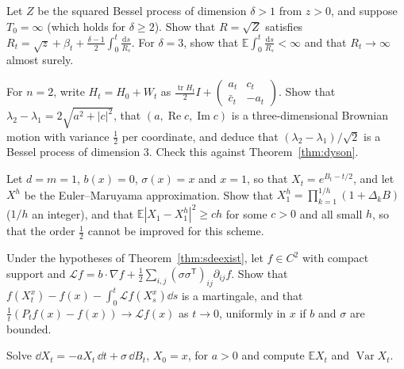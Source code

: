 \begin{exercise}[$\star\star$]\label{ex:bessel3}
Let $Z$ be the squared Bessel process of dimension $\delta>1$ from $z>0$, and suppose $T_0=\infty$ (which holds for $\delta\ge2$). Show that $R=\sqrt Z$ satisfies $R_t=\sqrt z+\beta_t+\frac{\delta-1}2\int_0^t\frac{\mathrm ds}{R_s}$.
For $\delta=3$, show that $\mathbb E\int_0^t\frac{\mathrm ds}{R_s}<\infty$ and that $R_t\to\infty$ almost surely.
\end{exercise}

\begin{exercise}[$\star\star$]\label{ex:twobytwo}
For $n=2$, write $H_t=H_0+W_t$ as $\frac{\operatorname{tr}H_t}2I+\begin{pmatrix}a_t&c_t\\\bar c_t&-a_t\end{pmatrix}$. Show that $\lambda_2-\lambda_1=2\sqrt{a^2+|c|^2}$, that $(a,\operatorname{Re}c,\operatorname{Im}c)$ is a
three-dimensional Brownian motion with variance $\frac12$ per coordinate, and deduce that $(\lambda_2-\lambda_1)/\sqrt2$ is a Bessel process of dimension $3$. Check this against Theorem~\ref{thm:dyson}.
\end{exercise}

\begin{exercise}[$\star\star$]\label{ex:emgbm}
Let $d=m=1$, $b(x)=0$, $\sigma(x)=x$ and $x=1$, so that $X_t=e^{B_t-t/2}$, and let $X^h$ be the Euler--Maruyama approximation. Show that $X^h_1=\prod_{k=1}^{1/h}(1+\Delta_kB)$ ($1/h$ an integer), and that
$\mathbb E|X_1-X^h_1|^2\ge ch$ for some $c>0$ and all small $h$, so that the order $\frac12$ cannot be improved for this scheme.
\end{exercise}

\begin{exercise}[$\star\star\star$]\label{ex:sdegenerator}
Under the hypotheses of Theorem~\ref{thm:sdeexist}, let $f\in C^2$ with compact support and $\mathcal Lf=b\cdot\nabla f+\frac12\sum_{i,j}(\sigma\sigma^{\mathsf T})_{ij}\partial_{ij}f$. Show that
$f(X^x_t)-f(x)-\int_0^t\mathcal Lf(X^x_s)\dd s$ is a martingale, and that $\frac1t(P_tf(x)-f(x))\to\mathcal Lf(x)$ as $t\to0$, uniformly in $x$ if $b$ and $\sigma$ are bounded.
\end{exercise}

\begin{exercise}[$\star$]\label{ex:v12oumoments}
Solve $\dd X_t=-aX_t\,\dd t+\sigma\,\dd B_t$, $X_0=x$, for $a>0$ and compute $\mathbb EX_t$ and $\operatorname{Var}X_t$.
\end{exercise}

